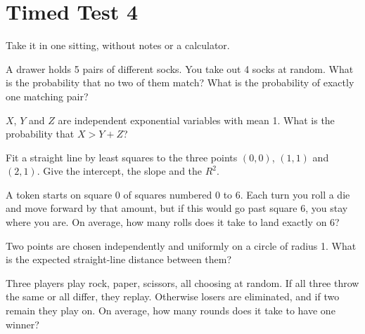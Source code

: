 \chapter{Timed Test 4}\label{ch:iv1:timed-test-4}

\begin{ivtrains}
Take it in one sitting, without notes or a calculator.
\end{ivtrains}


\begin{question}\label{iq:iv1:timed-test-4:1}
A drawer holds 5 pairs of different socks. You take out 4 socks at random. What is the probability that no two of them match? What is the probability of exactly one matching pair?
\end{question}

\begin{question}\label{iq:iv1:timed-test-4:2}
$X$, $Y$ and $Z$ are independent exponential variables with mean 1. What is the probability that $X > Y + Z$?
\end{question}

\begin{question}\label{iq:iv1:timed-test-4:3}
Fit a straight line by least squares to the three points $(0, 0)$, $(1, 1)$ and $(2, 1)$. Give the intercept, the slope and the $R^2$.
\end{question}

\begin{question}\label{iq:iv1:timed-test-4:4}
A token starts on square 0 of squares numbered 0 to 6. Each turn you roll a die and move forward by that amount, but if this would go past square 6, you stay where you are. On average, how many rolls does it take to land exactly on 6?
\end{question}

\begin{question}\label{iq:iv1:timed-test-4:5}
Two points are chosen independently and uniformly on a circle of radius 1. What is the expected straight-line distance between them?
\end{question}

\begin{question}\label{iq:iv1:timed-test-4:6}
Three players play rock, paper, scissors, all choosing at random. If all three throw the same or all differ, they replay. Otherwise losers are eliminated, and if two remain they play on. On average, how many rounds does it take to have one winner?
\end{question}

